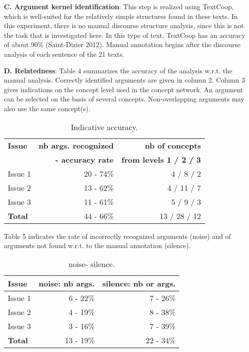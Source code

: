 \documentclass[11pt,letterpaper]{article}
\begin{document}
{\bf C. Argument kernel identification}: This step is realized using TextCoop, which is well-suited for  the relatively simple structures found in these texts. In this experiment, there is no manual discourse structure analysis, since this is not the task that is investigated here. In this type of text,
TextCoop has an accuracy of about 90\% (Saint-Dizier 2012). Manual annotation begins after the discourse analysis of each sentence of the 21 texts.

{\bf D. Relatedness}:
 Table 4 summarizes the accuracy  of the analysis w.r.t. the manual analysis. Correctly identified arguments are given in column 2. Column 3 gives indications on the concept level used in the concept network. An argument can be selected on the basis of several concepts. Non-overlapping arguments may also use the same concept(s).

\begin{table}
\small
\centering
\begin{tabular}{|l|r | r|}
\hline \bf Issue & \bf nb args. recognized  & \bf nb of concepts \\ 
 \bf  &  \bf - accuracy rate & \bf  from levels 1 / 2 / 3 \\ \hline
Issue 1 & 20 - 74\% & 4 / 8 / 2 \\
Issue 2 & 13 - 62\% & 4 / 11 / 7 \\
Issue 3 & 11 - 61\% & 5 / 9 / 3 \\
\hline
\bf Total & 44 - 66\% & 13 / 28 / 12 \\
\hline
\end{tabular}
\caption{\label{acc} Indicative accuracy.}
\end{table}

Table 5 indicates the rate of incorrectly recognized arguments (noise) and of arguments not found w.r.t. to the manual annotation (silence).

\begin{table}
\small
\centering
\begin{tabular}{|l|r | r|}
\hline \bf Issue & \bf noise: nb args.  & \bf silence: nb or args. \\  \hline
Issue 1 & 6 - 22\% & 7 - 26\% \\
Issue 2 & 4 - 19\% & 8 - 38\% \\
Issue 3 & 3 - 16\% & 7 - 39\% \\
\hline
\bf Total & 13 - 19\% & 22 - 34\%\\
\hline
\end{tabular}
\caption{\label{noise} noise- silence.}
\end{table}
\end{document}
